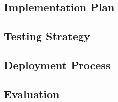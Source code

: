 \subsection{Implementation Plan}


\subsection{Testing Strategy}


\subsection{Deployment Process}

\subsection{Evaluation }



%
%



%         
